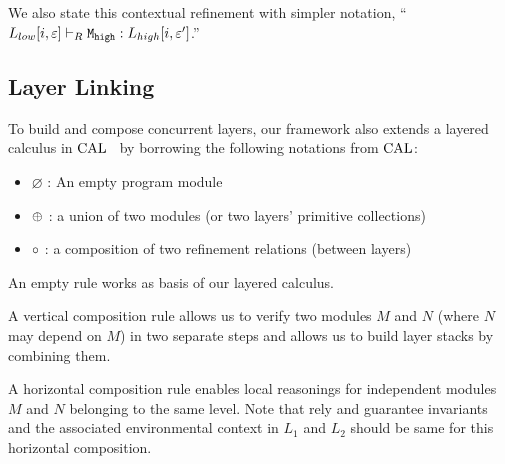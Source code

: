 {\noindent}We also state this contextual refinement with simpler notation, 
``$\ltyp{\PLayer{L_{low}}{i}{\oracle}}{R}{\codeinmath{M}_{\codeinmath{high}}}{\PLayer{L_{high}}{i}{\oracle'}}$.''



\subsection{Layer Linking}
\label{chapter:ccal:subsec:linking}


To build and compose concurrent layers, 
our framework also extends a layered calculus in $\calname$~\cite{deepspec} by 
borrowing the following notations 
from $\calname$:
\begin{itemize}
\item $\varnothing$ : An  empty program module
\item $\modulecomposekwd$ : a union of two modules (or two layers' primitive collections)
\item $\relcomposekwd$ : a composition of two refinement relations (between layers)
\end{itemize}

An empty rule works as basis of our layered calculus.
 \begin{mathpar}
\end{mathpar}

A vertical composition rule allows us
to verify two modules $M$ and $N$ (where $N$ may depend on $M$) 
in two separate steps and allows us to build layer stacks by combining them.
    \begin{mathpar}
\end{mathpar}

A horizontal composition rule enables local reasonings for independent
modules $M$ and $N$ belonging to the same level. Note that rely and guarantee invariants and the associated environmental context in $L_1$ and $L_2$ should 
be same for this horizontal composition.
 \begin{mathpar}
\end{mathpar}



